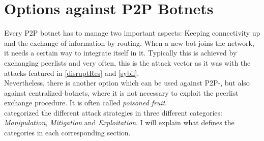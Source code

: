 \documentclass[10pt, a4paper, twocolumn]{article} %
\begin{document}
\section{Options against P2P Botnets}
Every P2P botnet has to manage two important aspects: Keeping connectivity up and the exchange of information by routing. When a new bot joins the network, it needs a certain way to integrate itself in it. Typically this is achieved by exchanging peerlists and very often, this is the attack vector as it was with the attacks featured in \autoref{disruptRes} and \autoref{sybil}. \\

Nevertheless, there is another option which can be used against P2P-, but also against centralized-botnets, where it is not necessary to exploit the peerlist exchange procedure. It is often called \textit{poisoned fruit}.\\

\citet{proactive} categorized the different attack strategies in three different categories: \textit{Manipulation}, \textit{Mitigation} and \textit{Exploitation}. I will explain what defines the categories in each corresponding section. 
\end{document}
